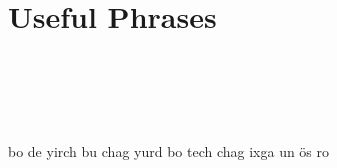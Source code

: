 \chapter{Useful Phrases}

\begin{multicols}{2}
\huge{\color{wordColor}{English}}\\
\Large

\\

\columnbreak 
\huge{\thetitle}\\
\Large

{bo de yirch bu chag yurd bo tech chag ixga un ös ro}\\

\end{multicols}
